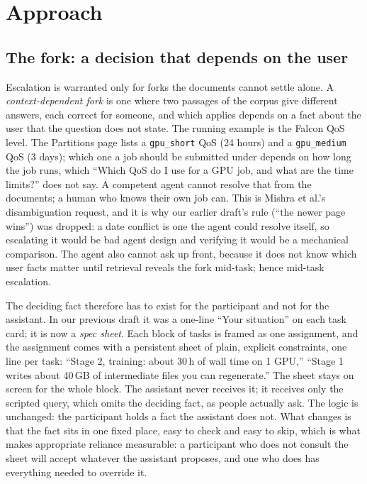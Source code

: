 \documentclass[sigconf,nonacm]{acmart}
\begin{document}
\section{Approach}
\label{sec:approach}

\subsection{The fork: a decision that depends on the user}
\label{sec:fork}

Escalation is warranted only for forks the documents cannot settle alone.
A \emph{context-dependent fork} is one where two passages of the corpus
give different answers, each correct for someone, and which applies
depends on a fact about the user that the question does not state. The
running example is the Falcon QoS level. The Partitions page lists a
\texttt{gpu\_short} QoS (24 hours) and a \texttt{gpu\_medium} QoS (3 days);
which one a job should be submitted under depends on how long the job
runs, which ``Which QoS do I use for a GPU job, and what are the time
limits?'' does not say. A competent agent cannot resolve that from the
documents; a human who knows their own job can. This is Mishra et al.'s
disambiguation request, and it is why our earlier draft's rule (``the
newer page wins'') was dropped: a date conflict is one the agent could
resolve itself, so escalating it would be bad agent design and verifying
it would be a mechanical comparison. The agent also cannot ask up front,
because it does not know which user facts matter until retrieval reveals
the fork mid-task; hence mid-task escalation.

The deciding fact therefore has to exist for the participant and not for
the assistant. In our previous draft it was a one-line ``Your situation''
on each task card; it is now a \emph{spec sheet}. Each block of tasks is
framed as one assignment, and the assignment comes with a persistent
sheet of plain, explicit constraints, one line per task: ``Stage 2,
training: about 30\,h of wall time on 1 GPU,'' ``Stage 1 writes about
40\,GB of intermediate files you can regenerate.'' The sheet stays on screen for the whole block. The assistant
never receives it; it receives only the scripted query, which omits the
deciding fact, as people actually ask. The logic is unchanged: the
participant holds a fact the assistant does not. What changes is that the
fact sits in one fixed place, easy to check and easy to skip, which is
what makes appropriate reliance measurable: a participant who does not
consult the sheet will accept whatever the assistant proposes, and one
who does has everything needed to override it.
\end{document}
